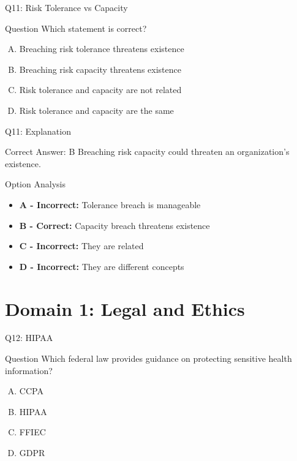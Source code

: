 \documentclass{beamer}
\begin{document}
	\begin{frame}{Q11: Risk Tolerance vs Capacity}
		\begin{block}{Question}
			Which statement is correct?
		\end{block}
		\begin{enumerate}[(A)]
			\item Breaching risk tolerance threatens existence
			\item Breaching risk capacity threatens existence
			\item Risk tolerance and capacity are not related
			\item Risk tolerance and capacity are the same
		\end{enumerate}
	\end{frame}
	
	\begin{frame}{Q11: Explanation}
		\begin{block}{Correct Answer: B}
			Breaching risk capacity could threaten an organization's existence.
		\end{block}
		\begin{block}{Option Analysis}
			\begin{itemize}
				\item \textbf{A - Incorrect:} Tolerance breach is manageable
				\item \textbf{B - Correct:} Capacity breach threatens existence
				\item \textbf{C - Incorrect:} They are related
				\item \textbf{D - Incorrect:} They are different concepts
			\end{itemize}
		\end{block}
	\end{frame}
	
	\section{Domain 1: Legal and Ethics}
	
	\begin{frame}{Q12: HIPAA}
		\begin{block}{Question}
			Which federal law provides guidance on protecting sensitive health information?
		\end{block}
		\begin{enumerate}[(A)]
			\item CCPA
			\item HIPAA
			\item FFIEC
			\item GDPR
		\end{enumerate}
	\end{frame}
	
\end{document}

